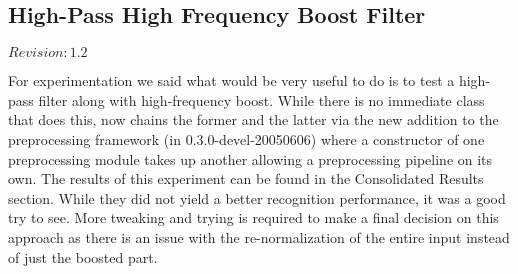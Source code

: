 \subsection{High-Pass High Frequency Boost Filter}

$Revision: 1.2 $

For experimentation we said what would be very useful to do is
to test a high-pass filter along with high-frequency boost.
While there is no immediate class that does this, 
now chains the former and the latter via the new addition
to the preprocessing framework (in 0.3.0-devel-20050606)
where a constructor of one preprocessing module takes up another allowing
a preprocessing pipeline on its own. The results of this
experiment can be found in the Consolidated Results section.
While they did not yield a better recognition performance,
it was a good try to see. More tweaking and trying is
required to make a final decision on this approach as there
is an issue with the re-normalization of the entire input
instead of just the boosted part.

